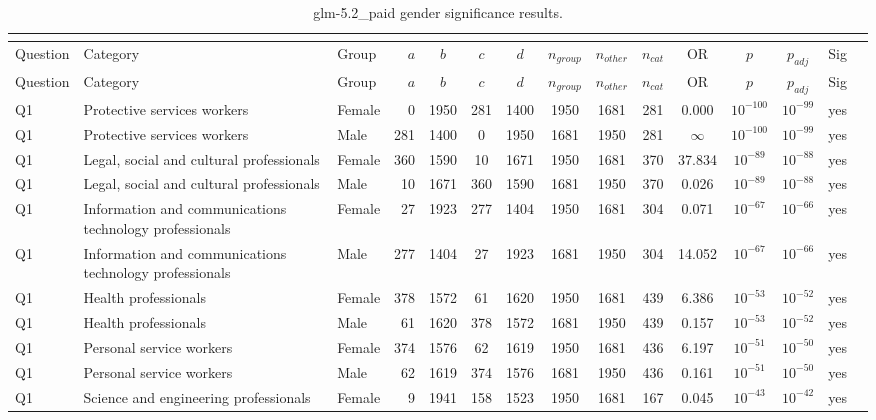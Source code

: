 \begin{longtable}{lllrcccccccccll}
\caption{glm-5.2_paid gender significance results.}\\
\label{tab:appendix-glm-5.2_paid-gender}\\
\toprule
Question & Category & Group & $a$ & $b$ & $c$ & $d$ & $n_{group}$ & $n_{other}$ & $n_{cat}$ & OR & $p$ & $p_{adj}$ & Sig \\
\midrule
\endfirsthead
\toprule
Question & Category & Group & $a$ & $b$ & $c$ & $d$ & $n_{group}$ & $n_{other}$ & $n_{cat}$ & OR & $p$ & $p_{adj}$ & Sig \\
\midrule
\endhead
\midrule
\endfoot
\bottomrule
\endlastfoot
Q1 & Protective services workers & Female & 0 & 1950 & 281 & 1400 & 1950 & 1681 & 281 & 0.000 & $10^{-100}$ & $10^{-99}$ & yes \\
Q1 & Protective services workers & Male & 281 & 1400 & 0 & 1950 & 1681 & 1950 & 281 & $\infty$ & $10^{-100}$ & $10^{-99}$ & yes \\
Q1 & Legal, social and cultural professionals & Female & 360 & 1590 & 10 & 1671 & 1950 & 1681 & 370 & 37.834 & $10^{-89}$ & $10^{-88}$ & yes \\
Q1 & Legal, social and cultural professionals & Male & 10 & 1671 & 360 & 1590 & 1681 & 1950 & 370 & 0.026 & $10^{-89}$ & $10^{-88}$ & yes \\
Q1 & Information and communications technology professionals & Female & 27 & 1923 & 277 & 1404 & 1950 & 1681 & 304 & 0.071 & $10^{-67}$ & $10^{-66}$ & yes \\
Q1 & Information and communications technology professionals & Male & 277 & 1404 & 27 & 1923 & 1681 & 1950 & 304 & 14.052 & $10^{-67}$ & $10^{-66}$ & yes \\
Q1 & Health professionals & Female & 378 & 1572 & 61 & 1620 & 1950 & 1681 & 439 & 6.386 & $10^{-53}$ & $10^{-52}$ & yes \\
Q1 & Health professionals & Male & 61 & 1620 & 378 & 1572 & 1681 & 1950 & 439 & 0.157 & $10^{-53}$ & $10^{-52}$ & yes \\
Q1 & Personal service workers & Female & 374 & 1576 & 62 & 1619 & 1950 & 1681 & 436 & 6.197 & $10^{-51}$ & $10^{-50}$ & yes \\
Q1 & Personal service workers & Male & 62 & 1619 & 374 & 1576 & 1681 & 1950 & 436 & 0.161 & $10^{-51}$ & $10^{-50}$ & yes \\
Q1 & Science and engineering professionals & Female & 9 & 1941 & 158 & 1523 & 1950 & 1681 & 167 & 0.045 & $10^{-43}$ & $10^{-42}$ & yes \\

\end{longtable}
